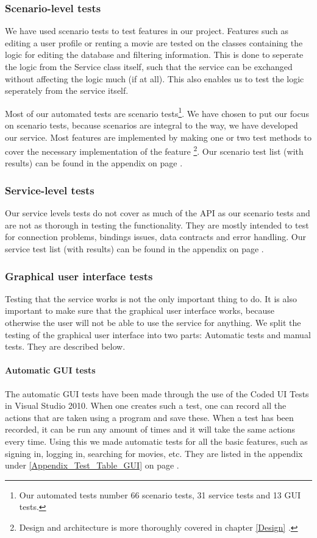 \subsubsection{Scenario-level tests}
\label{Testing_Strategy_Types_Scenario}
We have used scenario tests to test features in our project. Features such as editing a user profile or renting a movie are tested on the classes containing the logic for editing the database and filtering information. This is done to seperate the logic from the Service class itself, such that the service can be exchanged without affecting the logic much (if at all). This also enables us to test the logic seperately from the service itself.

Most of our automated tests are scenario tests\footnote{Our automated tests number 66 scenario tests, 31 service tests and 13 GUI tests.}. We have chosen to put our focus on scenario tests, because scenarios are integral to the way, we have developed our service. Most features are implemented by making one or two test methods to cover the necessary implementation of the feature \footnote{Design and architecture is more thoroughly covered in chapter \ref{Design} .}. Our scenario test list (with results) can be found in the appendix on page \pageref{Appendix_Test_Table_Scenario}.
\subsubsection{Service-level tests}
\label{Testing_Strategy_Types_Service}
Our service levels tests do not cover as much of the API as our scenario tests and are not as thorough in testing the functionality. They are mostly intended to test for connection problems, bindings issues, data contracts and error handling. Our service test list (with results) can be found in the appendix on page \pageref{Appendix_Test_Table_Service}.

\subsubsection{Graphical user interface tests}
\label{Testing_Strategy_Types_EndUser}
Testing that the service works is not the only important thing to do. It is also important to make sure that the graphical user interface works, because otherwise the user will not be able to use the service for anything. We split the testing of the graphical user interface into two parts: Automatic tests and manual tests. They are described below. 

\paragraph{Automatic GUI tests}
The automatic GUI tests have been made through the use of the Coded UI Tests in Visual Studio 2010. When one creates such a test, one can record all the actions that are taken using a program and save these. When a test has been recorded, it can be run any amount of times and it will take the same actions every time. Using this we made automatic tests for all the basic features, such as signing in, logging in, searching for movies, etc. They are listed in the appendix under \ref{Appendix_Test_Table_GUI} on page \pageref{Appendix_Test_Table_GUI}.

